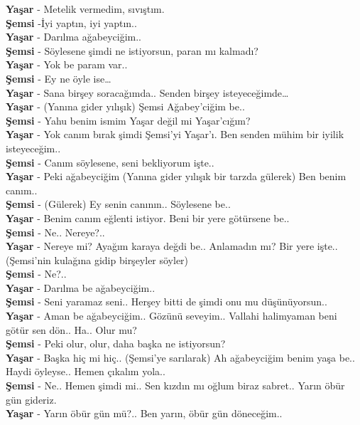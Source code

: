 \documentclass[]{book}
\begin{document}
\textbf{Yaşar} - Metelik vermedim, sıvıştım.\\
\textbf{Şemsi} -İyi yaptın, iyi yaptın..\\
\textbf{Yaşar} - Darılma ağabeyciğim..\\
\textbf{Şemsi} - Söylesene şimdi ne istiyorsun, paran mı kalmadı?\\
\textbf{Yaşar} - Yok be param var..\\
\textbf{Şemsi} - Ey ne öyle ise\ldots{}\\
\textbf{Yaşar} - Sana birşey soracağımda.. Senden birşey isteyeceğimde\ldots{}\\
\textbf{Yaşar} - (Yanına gider yılışık) Şemsi Ağabey'ciğim be..\\
\textbf{Şemsi} - Yahu benim ismim Yaşar değil mi Yaşar'cığım?\\
\textbf{Yaşar} - Yok canım bırak şimdi Şemsi'yi Yaşar'ı. Ben senden mühim bir iyilik isteyeceğim..\\
\textbf{Şemsi} - Canım söylesene, seni bekliyorum işte..\\
\textbf{Yaşar} - Peki ağabeyciğim (Yanına gider yılışık bir tarzda gülerek) Ben benim canım..\\
\textbf{Şemsi} - (Gülerek) Ey senin canının.. Söylesene be..\\
\textbf{Yaşar} - Benim canım eğlenti istiyor. Beni bir yere götürsene be..\\
\textbf{Şemsi} - Ne.. Nereye?..\\
\textbf{Yaşar} - Nereye mi? Ayağım karaya değdi be.. Anlamadın mı? Bir yere işte.. (Şemsi'nin kulağına gidip birşeyler söyler)\\
\textbf{Şemsi} - Ne?..\\
\textbf{Yaşar} - Darılma be ağabeyciğim..\\
\textbf{Şemsi} - Seni yaramaz seni.. Herşey bitti de şimdi onu mu düşünüyorsun..\\
\textbf{Yaşar} - Aman be ağabeyciğim.. Gözünü seveyim.. Vallahi halimyaman beni götür sen dön.. Ha.. Olur mu?\\
\textbf{Şemsi} - Peki olur, olur, daha başka ne istiyorsun?\\
\textbf{Yaşar} - Başka hiç mi hiç.. (Şemsi'ye sarılarak) Ah ağabeyciğim benim yaşa be.. Haydi öyleyse.. Hemen çıkalım yola..\\
\textbf{Şemsi} - Ne.. Hemen şimdi mi.. Sen kızdın mı oğlum biraz sabret.. Yarın öbür gün gideriz.\\
\textbf{Yaşar} - Yarın öbür gün mü?.. Ben yarın, öbür gün döneceğim..\\
\end{document}
